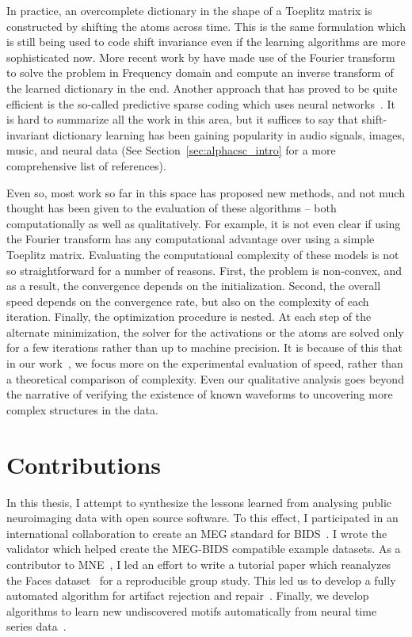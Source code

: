 In practice, an overcomplete dictionary in the shape of a Toeplitz matrix is constructed by shifting the atoms across time. This is the same formulation which is still being used to code shift invariance even if the learning algorithms are more sophisticated now. More recent work by \cite{grosse2012shift} have made use of the Fourier transform to solve the problem in Frequency domain and compute an inverse transform of the learned dictionary in the end. Another approach that has proved to be quite efficient is the so-called predictive sparse coding which uses neural networks~\citep{kavukcuoglu2010learning}. It is hard to summarize all the work in this area, but it suffices to say that shift-invariant dictionary learning has been gaining popularity in audio signals, images, music, and neural data (See Section~\ref{sec:alphacsc_intro} for a more comprehensive list of references).

Even so, most work so far in this space has proposed new methods, and not much thought has been given to the evaluation of these algorithms -- both computationally as well as qualitatively. For example, it is not even clear if using the Fourier transform has any computational advantage over using a simple Toeplitz matrix. Evaluating the computational complexity of these models is not so straightforward for a number of reasons. First, the problem is non-convex, and as a result, the convergence depends on the initialization. Second, the overall speed depends on the convergence rate, but also on the complexity of each iteration. Finally, the optimization procedure is nested. At each step of the alternate minimization, the solver for the activations or the atoms are solved only for a few iterations rather than up to machine precision. It is because of this that in our work~\citep{jas2017learning}, we focus more on the experimental evaluation of speed, rather than a theoretical comparison of complexity. Even our qualitative analysis goes beyond the narrative of verifying the existence of known waveforms to uncovering more complex structures in the data. 

\clearpage
\section{Contributions}
In this thesis, I attempt to synthesize the lessons learned from analysing public neuroimaging data with open source software. To this effect, I participated in an international collaboration to create an \ac{MEG} standard for  \ac{BIDS}~\citep{galan2017meg}. I wrote the validator which helped create the MEG-BIDS compatible example datasets. As a contributor to MNE~\citep{gramfort2013meg}, I led an effort to write a tutorial paper which reanalyzes the Faces dataset~\citep{wakeman2015multi} for a reproducible group study. This led us to develop a fully automated algorithm for artifact rejection and repair~\citep{jas2016automated, jas2017autoreject}. Finally, we develop algorithms to learn new undiscovered motifs automatically from neural time series data~\citep{jas2017learning}. 

